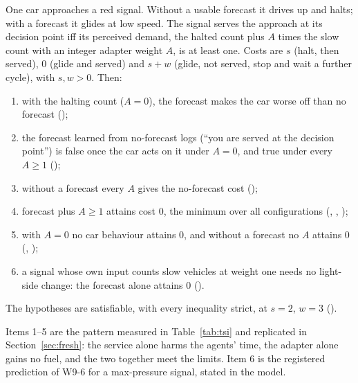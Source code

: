 \begin{theorem}\label{thm:twosided}
One car approaches a red signal. Without a usable forecast it drives up and halts; with a forecast it glides at low speed. The signal serves
the approach at its decision point iff its perceived demand, the halted count plus $A$ times the slow count with an integer adapter weight
$A$, is at least one. Costs are $s$ (halt, then served), $0$ (glide and served) and $s+w$ (glide, not served, stop and wait a further
cycle), with $s,w>0$. Then:
\begin{enumerate}\setlength\itemsep{0pt}
\item with the halting count ($A=0$), the forecast makes the car worse off than no forecast ();
\item the forecast learned from no-forecast logs (``you are served at the decision point'') is false once the car acts on it under $A=0$,
and true under every $A\ge1$ ();
\item without a forecast every $A$ gives the no-forecast cost ();
\item forecast plus $A\ge1$ attains cost 0, the minimum over all configurations (, ,
);
\item with $A=0$ no car behaviour attains 0, and without a forecast no $A$ attains 0 (,
);
\item a signal whose own input counts slow vehicles at weight one needs no light-side change: the forecast alone attains 0
().
\end{enumerate}
The hypotheses are satisfiable, with every inequality strict, at $s=2$, $w=3$ ().
\end{theorem}
Items 1--5 are the pattern measured in Table~\ref{tab:tsi} and replicated in Section~\ref{sec:fresh}: the service alone harms the agents'
time, the adapter alone gains no fuel, and the two together meet the limits. Item 6 is the registered prediction of W9-6 for a
max-pressure signal, stated in the model.

